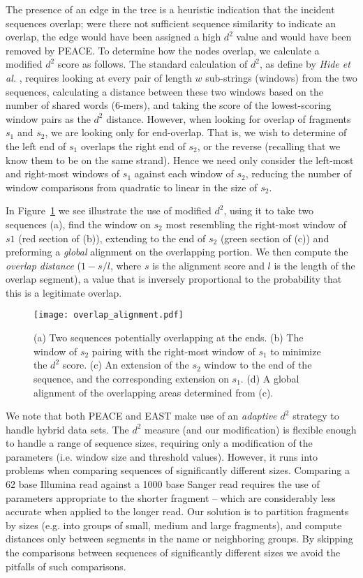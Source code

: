 \documentclass[10pt]{bmc_article}
\newcommand{\peace} {{\small PEACE}}
\newcommand{\east} {{\small EAST}}
\newenvironment{bmcformat}{\begin{raggedright}\baselineskip20pt\sloppy\setboolean{publ}{false}}{\end{raggedright}\baselineskip20pt\sloppy}
\begin{document}
\begin{bmcformat}
The presence of an edge in the tree is a heuristic indication that the
incident sequences overlap; were there not sufficient sequence
similarity to indicate an overlap, the edge would have been assigned a
high $d^2$ value and would have been removed by \peace\/.  To
determine how the nodes overlap, we calculate a modified $d^2$ score
as follows.  The standard calculation of $d^2$, as define by {\it Hide
  et al.} \cite{Hide94}, requires looking at every pair of length $w$
sub-strings (windows) from the two sequences, calculating a distance
between these two windows based on the number of shared words
(6-mers), and taking the score of the lowest-scoring window pairs as
the $d^2$ distance.  However, when looking for overlap of fragments
$s_1$ and $s_2$, we are looking only for end-overlap.  That is, we
wish to determine of the left end of $s_1$ overlaps the right end of
$s_2$, or the reverse (recalling that we know them to be on the same
strand).  Hence we need only consider the left-most and right-most
windows of $s_1$ against each window of $s_2$, reducing the number of
window comparisons from quadratic to linear in the size of $s_2$.

In Figure~\ref{fig:overlap} we see illustrate the use of modified $d^2$,
using it to take two sequences (a), find the window on $s_2$ most
resembling the right-most window of $s1$ (red section of (b)),
extending to the end of $s_2$ (green section of (c)) and preforming a
{\it global} alignment on the overlapping portion.  We then compute the
{\it overlap distance} ($1 - s/l$, where $s$ is the alignment score and
$l$ is the length of the overlap segment), a value that is inversely
proportional to the probability that this is a legitimate overlap.

\begin{figure}
\centerline{\texttt{[image: overlap\_alignment.pdf]}}
\caption{(a) Two sequences potentially overlapping at the ends.  (b)
  The window of $s_2$ pairing with the right-most window of $s_1$ to
  minimize the $d^2$ score.  (c) An extension of the $s_2$ window to
  the end of the sequence, and the corresponding extension on $s_1$.
  (d) A global alignment of the overlapping areas determined from
  (c).}\label{fig:overlap}
\end{figure}


We note that both \peace\/ and \east\/ make use of an {\it adaptive
  $d^2$} strategy to handle hybrid data sets.  The $d^2$ measure (and
our modification) is flexible enough to handle a range of sequence
sizes, requiring only a modification of the parameters (i.e. window
size and threshold values).  However, it runs into problems when
comparing sequences of significantly different sizes.  Comparing a 62
base Illumina read against a 1000 base Sanger read requires the use of
parameters appropriate to the shorter fragment -- which are
considerably less accurate when applied to the longer read.  Our
solution is to partition fragments by sizes (e.g. into groups of
small, medium and large fragments), and compute distances only
between segments in the name or neighboring groups.  By skipping the
comparisons between sequences of significantly different sizes we
avoid the pitfalls of such comparisons.


\end{bmcformat}
\end{document}
